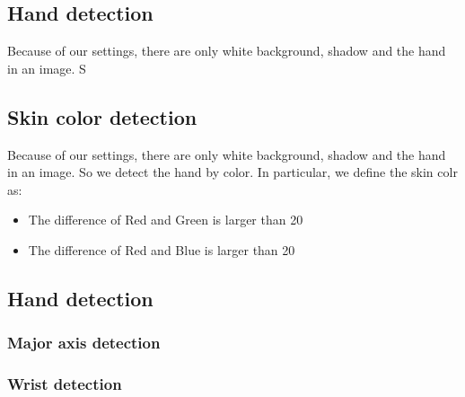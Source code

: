 \subsection{Hand detection}
Because of our settings, there are only white background, shadow and the hand in an image\cite{ra11}.
S
\subsection{Skin color detection}
Because of our settings, there are only white background, shadow and the hand in an image.
So we detect the hand by color. 
In particular, we define the skin colr as:
\begin{itemize}
  \item The difference of Red and Green is larger than 20
  \item The difference of Red and Blue is larger than 20
 \end{itemize}
\subsection{Hand detection}
\subsubsection{Major axis detection}
\subsubsection{Wrist detection}

